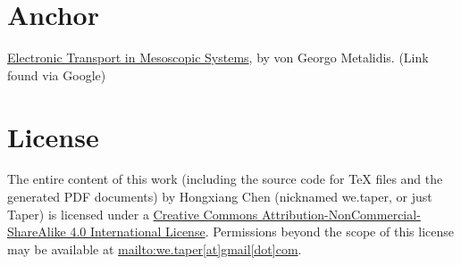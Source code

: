 \documentclass{article}
\numberwithin{equation}{subsection} %
\theoremstyle{definition}
\begin{document}
\section{Anchor}

\begin{thebibliography}{1}
        \href{https://sundoc.bibliothek.uni-halle.de/diss-online/07/07H039/prom.pdf}{Electronic Transport in Mesoscopic Systems}, 
        by von Georgo Metalidis. (Link found via Google)
\end{thebibliography}
\section{License}
The entire content of this work (including the source code
for TeX files and the generated PDF documents) by 
Hongxiang Chen (nicknamed we.taper, or just Taper) is
licensed under a 
\href{http://creativecommons.org/licenses/by-nc-sa/4.0/}{Creative 
Commons Attribution-NonCommercial-ShareAlike 4.0 International 
License}. Permissions beyond the scope of this 
license may be available at \url{mailto:we.taper[at]gmail[dot]com}.
\end{document}
